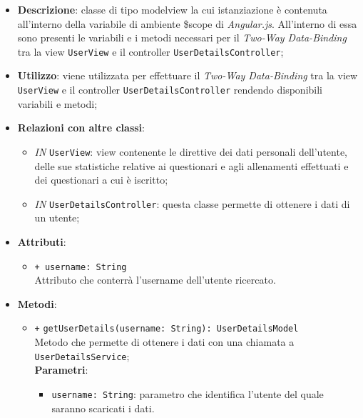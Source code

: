 		\begin{itemize}
			\item \textbf{Descrizione}: classe di tipo modelview la cui istanziazione è contenuta all'interno della variabile di ambiente \$scope di \textit{Angular.js}. All'interno di essa sono presenti le variabili e i metodi necessari per il \textit{Two-Way Data-Binding} tra la view \texttt{UserView} e il controller \texttt{UserDetailsController};
			\item \textbf{Utilizzo}: viene utilizzata per effettuare il \textit{Two-Way Data-Binding} tra la view \texttt{UserView} e il controller \texttt{UserDetailsController} rendendo disponibili variabili e metodi;
			\item \textbf{Relazioni con altre classi}: 
			\begin{itemize}
				\item \textit{IN} \texttt{UserView}: view contenente le direttive dei dati personali dell'utente, delle sue statistiche relative ai questionari e agli allenamenti effettuati e dei questionari a cui è iscritto; 
				\item \textit{IN} \texttt{UserDetailsController}: questa classe permette di ottenere i dati di un utente;
			\end{itemize}
			\item \textbf{Attributi}: 
			\begin{itemize}
				\item \texttt{+ username: String} \\ Attributo che conterrà l'username dell'utente ricercato.
			\end{itemize}
			\item \textbf{Metodi}:
			\begin{itemize}
				\item \texttt{+} \texttt{getUserDetails(username: String): UserDetailsModel} \\ Metodo che permette di ottenere i dati con una chiamata a \texttt{UserDetailsService}; \\
				\textbf{Parametri}:
				\begin{itemize}
					\item \texttt{username: String}: parametro che identifica l'utente del quale saranno scaricati i dati.
				\end{itemize} 
			\end{itemize}
		\end{itemize}
		
			